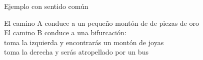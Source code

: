 \begin{frame}{Ejemplo con sentido com\'un}
    
    El camino A conduce a un pequeño mont\'on de de piezas de oro\\
    El camino B conduce a una bifurcaci\'on:\\
    \quad toma la izquierda y encontrar\'as un mont\'on de joyas\\
    \quad toma la derecha y ser\'as atropellado por un bus
    
\end{frame}

